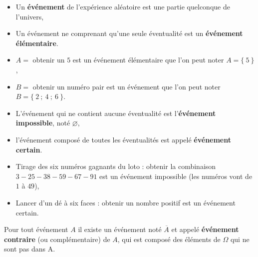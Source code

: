 \begin{defi}{}{}
   \begin{itemize}
      \item  Un \textbf{événement} de l'expérience aléatoire est une partie quelconque de l'univers,
      \item  Un événement ne comprenant qu'une seule éventualité est un \textbf{événement élémentaire}.
   \end{itemize}
\end{defi}

\begin{ex}{}{}
   \begin{itemize}
      \item  $A=$ \og obtenir un $5$ \fg{} est un événement élémentaire que l'on peut noter $A=\{~5~\}$,
      \item  $B=$ \og obtenir un numéro pair \fg{} est un événement que l'on peut noter $B=\{~2~;~4~;~6~\}$.
   \end{itemize}
\end{ex}

\begin{defi}{}{}
   \begin{itemize}
      \item  L'événement qui ne contient aucune éventualité est l'\textbf{événement impossible}, noté $\varnothing$,
      \item  l'événement composé de toutes les éventualités est appelé \textbf{événement certain}.
   \end{itemize}
\end{defi}

\begin{ex}{}{}
   \begin{itemize}
      \item  Tirage des six numéros gagnants du loto : \og obtenir la combinaison $3-25-38-59-67-91$ \fg{} est un événement impossible (les numéros vont de $1$ à $49$),
      \item  Lancer d'un dé à six faces : \og obtenir un nombre positif \fg{} est un événement certain.
   \end{itemize}
\end{ex}

\begin{defi}{}{}
   Pour tout événement $A$ il existe un événement noté $\overline{A}$ et appelé \textbf{événement contraire} (ou complémentaire) de $A$, qui est composé des éléments de $\Omega$ qui ne sont pas dans A.
\end{defi}


